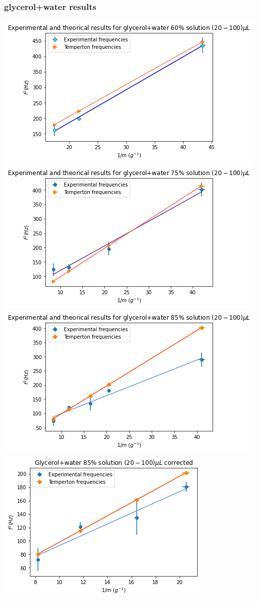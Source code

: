 \documentclass[xcolor=table]{beamer}
\begin{document}
\begin{frame}

\frametitle{glycerol+water results}
\fontsize{10}{10.2} \selectfont
\includegraphics[width=.55\columnwidth]{grap_gly60.PNG}
\includegraphics[width=.55\columnwidth]{grap_gly75.PNG}\\
\includegraphics[width=.55\columnwidth]{grap_gly85.PNG}
\includegraphics[width=.45\columnwidth]{grap_gly85sc.PNG}\\

\end{frame}
\end{document}
